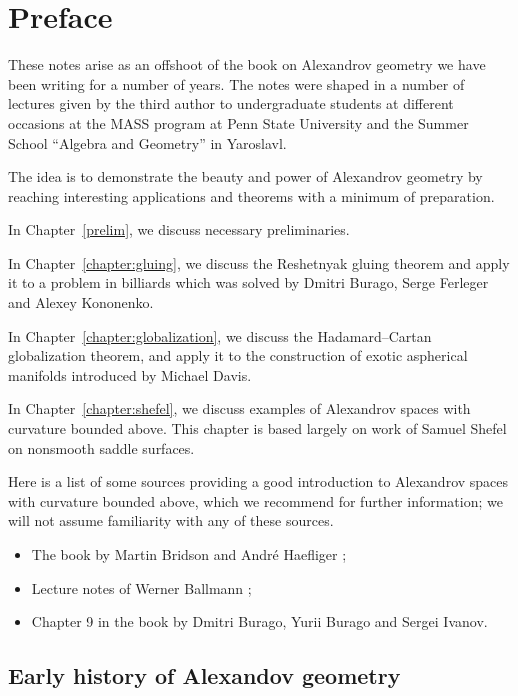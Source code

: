 \mainmatter

\chapter*{Preface}

These notes arise as an offshoot 
of the book on Alexandrov geometry we have been writing for  a number of years.
The notes were shaped in a number of lectures given by the third author
to undergraduate students 
at different  occasions at the
MASS program at Penn State University
and the Summer School ``Algebra and Geometry'' in Yaroslavl.

The idea is to demonstrate the beauty and power of Alexandrov geometry by reaching interesting applications and theorems with a minimum of preparation.

\medskip 

In Chapter~\ref{prelim}, we discuss necessary preliminaries.

In Chapter~\ref{chapter:gluing}, we discuss the Reshetnyak gluing theorem and apply it to a problem in billiards which was solved by Dmitri Burago, Serge Ferleger and Alexey Kononenko.

In Chapter~\ref{chapter:globalization}, we discuss the Hadamard--Cartan globalization theorem, and apply it to the construction of exotic aspherical manifolds introduced by Michael Davis.

In Chapter~\ref{chapter:shefel}, we discuss examples of Alexandrov spaces with curvature bounded above.
This chapter is based largely on work of Samuel Shefel on nonsmooth saddle surfaces.

\medskip

Here is a list of some sources providing a good introduction to Alexandrov spaces with curvature bounded above, which we recommend for further information;
we will not assume familiarity with any of these sources.

\begin{itemize}
\item The book by Martin Bridson and Andr\'e Haefliger \cite{BH};
\item Lecture notes of Werner Ballmann \cite{ballmann:lectures};
\item Chapter 9 in the book \cite{BBI} by Dmitri Burago, Yurii Burago and Sergei Ivanov.
\end{itemize}



\section*{Early history of Alexandov geometry}


